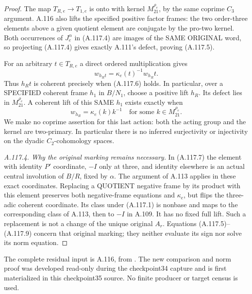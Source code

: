 \begin{proof}
The map \(T_{R,e}\to T_{1,e}\) is onto with kernel
\(M_{21}^{\rho_e}\), by the same coprime \(C_3\) argument.
A.116 also lifts the specified positive factor frames:
the two order-three elements above a given quotient element
are conjugate by the pro-two kernel.
Both occurrences of \(J_e^\alpha\) in (A.117.4) are images of
the SAME ORIGINAL word, so projecting (A.117.4) gives exactly
A.111's defect, proving (A.117.5).

For an arbitrary \(t\in T_{R,e}\) a direct ordered multiplication
gives
\[
                 w_{h_Rt}=\kappa_e(t)^{-1}w_{h_R}t.
 \tag{A.117.8}
\]
Thus \(h_Rt\) is coherent precisely when (A.117.6) holds.
In particular, over a SPECIFIED coherent frame \(h_1\) in \(B/N_1\),
choose a positive lift \(h_R\). Its defect lies in
\(M_{21}^{\rho_e}\). A coherent lift of this SAME \(h_1\) exists
exactly when
\[
 w_{h_R}=\kappa_e(k)k^{-1}
                 \quad\text{for some }k\in M_{21}^{\rho_e}.
 \tag{A.117.9}
\]
We make no coprime assertion for this last action: both the
acting group and the kernel are two-primary.
In particular there is no inferred surjectivity or injectivity
on the dyadic \(C_2\)-cohomology spaces.

\emph{A.117.4. Why the original marking remains necessary.}
In (A.117.7) the element with identity \(P'\) coordinate,
\(-I\) only at three, and identity elsewhere is an actual
central involution of \(B/R\), fixed by \(\alpha\).
The argument of A.113 applies in these exact coordinates.
Replacing a QUOTIENT negative frame by its product with this
element preserves both negative-frame equations and \(\kappa_e\),
but flips the three-adic coherent coordinate.
Its class under (A.117.1) is nonbase and maps to the corresponding
class of A.113, then to \(-I\) in A.109.
It has no fixed full lift. Such a replacement is not a change of
the unique original \(A_r\).
Equations (A.117.5)--(A.117.9) concern that original marking;
they neither evaluate its sign nor solve its norm equation.
\end{proof}

\begingroup\footnotesize\raggedright
The complete residual input is A.116, from
.
The new comparison and norm proof was developed read-only during
the checkpoint34 capture and is first materialized in this
checkpoint35 source. No finite producer or target census is used.
\par\endgroup
